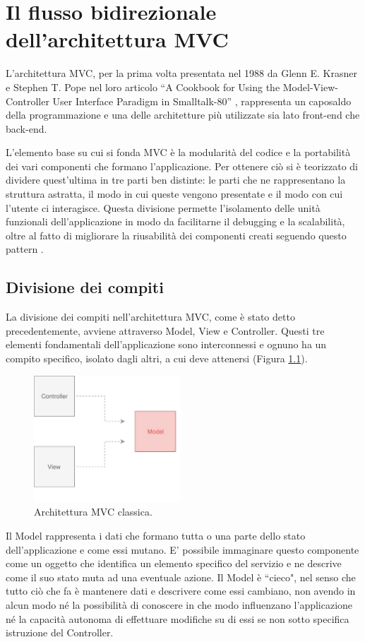 \chapter{Il flusso bidirezionale dell'architettura MVC}
L'architettura MVC, per la prima volta presentata nel 1988 da Glenn E. Krasner e Stephen T. Pope nel loro articolo “A Cookbook for Using the Model-View-Controller User Interface Paradigm in Smalltalk-80” \cite{KrasnerAndPopeOnMVC}, rappresenta un caposaldo della programmazione e una delle architetture più utilizzate sia lato front-end che back-end.

L'elemento base su cui si fonda MVC è la modularità del codice e la portabilità dei vari componenti che formano l'applicazione. Per ottenere ciò si è teorizzato di dividere quest'ultima in tre parti ben distinte: le parti che ne rappresentano la struttura astratta, il modo in cui queste vengono presentate e il modo con cui l'utente ci interagisce. Questa divisione permette l'isolamento delle unità funzionali dell'applicazione in modo da facilitarne il debugging e la scalabilità, oltre al fatto di migliorare la riusabilità dei componenti creati seguendo questo pattern \cite{KrasnerAndPopeOnMVC}.

\section{Divisione dei compiti}
La divisione dei compiti nell'architettura MVC, come è stato detto precedentemente, avviene attraverso Model, View e Controller. Questi tre elementi fondamentali dell'applicazione sono interconnessi e ognuno ha un compito specifico, isolato dagli altri, a cui deve attenersi (Figura \ref{MVCdefault}).

\begin{figure}
\centering 
\includegraphics[width=5.5cm]{./images/MVCdefault}
\caption{Architettura MVC classica.}
\label{MVCdefault}
\end{figure}

Il Model rappresenta i dati che formano tutta o una parte dello stato dell'applicazione e come essi mutano. E' possibile immaginare questo componente come un oggetto che identifica un elemento specifico del servizio e ne descrive come il suo stato muta ad una eventuale azione. Il Model è “cieco", nel senso che tutto ciò che fa è mantenere dati e descrivere come essi cambiano, non avendo in alcun modo né la possibilità di conoscere in che modo influenzano l'applicazione né la capacità autonoma di effettuare modifiche su di essi se non sotto specifica istruzione del Controller.

